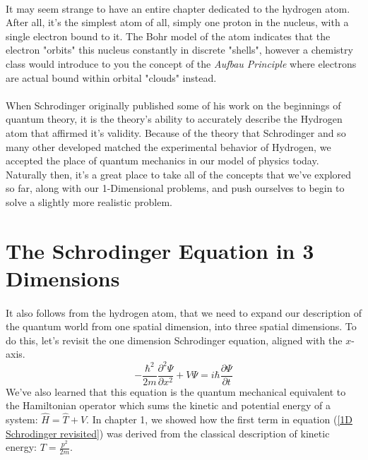 \documentclass[12pt,letterpaper]{book}
\begin{document}
\paragraph*{}It may seem strange to have an entire chapter dedicated to the hydrogen atom. After all, it's the simplest atom of all, simply one proton in the nucleus, with a single electron bound to it.  The Bohr model of the atom indicates that the electron "orbits" this nucleus constantly in discrete "shells", however a chemistry class would introduce to you the concept of the \textit{Aufbau Principle} where electrons are actual bound within orbital "clouds" instead.
\paragraph*{}When Schrodinger originally published some of his work on the beginnings of quantum theory, it is the theory's ability to accurately describe the Hydrogen atom that affirmed it's validity. Because of the theory that Schrodinger and so many other developed matched the experimental behavior of Hydrogen, we accepted the place of quantum mechanics in our model of physics today. Naturally then, it's a great place to take all of the concepts that we've explored so far, along with our 1-Dimensional problems, and push ourselves to begin to solve a slightly more realistic problem. 


\section{The Schrodinger Equation in 3 Dimensions}
\paragraph{}It also follows from the hydrogen atom, that we need to expand our description of the quantum world from one spatial dimension, into three spatial dimensions. To do this, let's revisit the one dimension Schrodinger equation, aligned with the $x$-axis.
\begin{equation}
\label{1D Schrodinger revisited}
-\frac{\hbar^2}{2m}\frac{\partial^2\Psi}{\partial x^2} +
V\Psi = i\hbar\frac{\partial \Psi}{\partial t}
\end{equation}
We've also learned that this equation is the quantum mechanical equivalent to the Hamiltonian operator which sums the kinetic and potential energy of a system: $\hat{H} = \hat{T} + \hat{V}$. In chapter 1, we showed how the first term in equation (\ref{1D Schrodinger revisited}) was derived from the classical description of kinetic energy: $T = \frac{p^2}{2m}$.
\end{document}
